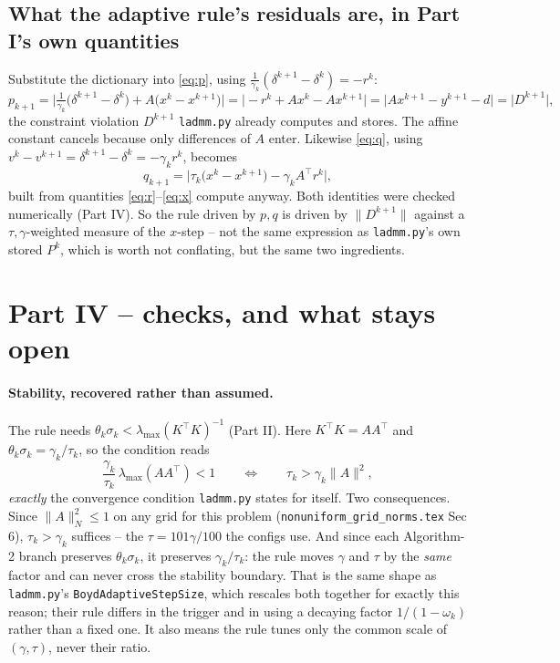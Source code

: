 \documentclass[11pt]{article}
\newcommand{\code}[1]{\texttt{#1}}
\begin{document}
\subsection*{What the adaptive rule's residuals are, in Part I's own quantities}
Substitute the dictionary into \eqref{eq:p}, using
$\tfrac1{\gamma_k}(\delta^{k+1}-\delta^k)=-r^k$:
\[
p_{k+1}=\Big|\tfrac1{\gamma_k}\big(\delta^{k+1}-\delta^{k}\big)+A\big(x^{k}-x^{k+1}\big)\Big|
=\big|-r^k+Ax^k-Ax^{k+1}\big|
=\big|Ax^{k+1}-y^{k+1}-d\big|=\big|D^{k+1}\big|,
\]
the constraint violation $D^{k+1}$ \code{ladmm.py} already computes and stores.
The affine constant cancels because only differences of $A$ enter. Likewise
\eqref{eq:q}, using $v^k-v^{k+1}=\delta^{k+1}-\delta^k=-\gamma_kr^k$, becomes
\[
q_{k+1}=\Big|\tau_k\big(x^{k}-x^{k+1}\big)-\gamma_kA^\top r^{k}\Big|,
\]
built from quantities \eqref{eq:r}--\eqref{eq:x} compute anyway. Both identities
were checked numerically (Part IV). So the rule driven by $p,q$ is driven by
$\|D^{k+1}\|$ against a $\tau,\gamma$-weighted measure of the $x$-step -- not the
same expression as \code{ladmm.py}'s own stored $P^k$, which is worth not
conflating, but the same two ingredients.

\section*{Part IV -- checks, and what stays open}
\paragraph{Stability, recovered rather than assumed.}
The rule needs $\theta_k\sigma_k<\lambda_{\max}(K^\top K)^{-1}$ (Part II). Here
$K^\top K=AA^\top$ and $\theta_k\sigma_k=\gamma_k/\tau_k$, so the condition reads
\[
\frac{\gamma_k}{\tau_k}\,\lambda_{\max}(AA^\top)<1
\qquad\Longleftrightarrow\qquad
\tau_k>\gamma_k\|A\|^2,
\]
\emph{exactly} the convergence condition \code{ladmm.py} states for itself. Two
consequences. Since $\|A\|_N^2\le1$ on any grid for this problem
(\code{nonuniform\_grid\_norms.tex} Sec 6), $\tau_k>\gamma_k$ suffices -- the
$\tau=101\gamma/100$ the configs use. And since each Algorithm-2 branch preserves
$\theta_k\sigma_k$, it preserves $\gamma_k/\tau_k$: the rule moves $\gamma$ and
$\tau$ by the \emph{same} factor and can never cross the stability boundary. That
is the same shape as \code{ladmm.py}'s \code{BoydAdaptiveStepSize}, which rescales
both together for exactly this reason; their rule differs in the trigger and in
using a decaying factor $1/(1-\omega_k)$ rather than a fixed one. It also means
the rule tunes only the common scale of $(\gamma,\tau)$, never their ratio.
\end{document}
